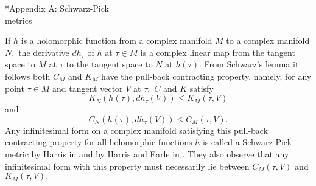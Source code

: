 \documentclass[12pt]{amsart}
\theoremstyle{remark}
\theoremstyle{definition}
\theoremstyle{definition}
\begin{document}
  
\begin{section}*{Appendix A: Schwarz-Pick metrics\ \  \ \  \ \ \ \ \ \ \ \ \ \ \ \ \ \ \ \ \  \  \ \  \ \ \ \ \ \ \ \ \ \ \ \ \ \ \ \ \ }

 
  If $h$ is a holomorphic function from a complex manifold $M$ to a complex manifold $N,$  
  the derivative $dh_{\tau}$ of $h$ at $\tau \in M$  is a complex linear map from the tangent 
  space to $M$ at $\tau$ to the tangent space to $N$ at $h(\tau).$  From Schwarz's lemma it follows both $C_M$ and $K_M$ have the pull-back contracting property, 
  namely, 
  for any point $\tau \in M$ and tangent vector $V$ at $\tau,$  $C$ and $K$ satisfy
           \begin{equation}\label{pullbackK}K_N(h(\tau),dh_{\tau}(V)) \leq K_M(\tau,V)\end{equation}
           and
           \begin{equation}\label{pullbackC}
           C_N(h(\tau),dh_{\tau}(V)) \leq C_M(\tau,V).
           \end{equation}
Any infinitesimal form on a complex manifold  satisfying this pull-back contracting property for all holomorphic functions $h$ is called a  Schwarz-Pick metric by Harris in \cite{Harr79} and by Harris and Earle in \cite{EarleHarris}.  They also observe that any infinitesimal form with this property must necessarily lie between $C_M(\tau,V)$ and $K_M(\tau,V).$
\end{section}
\end{document}
